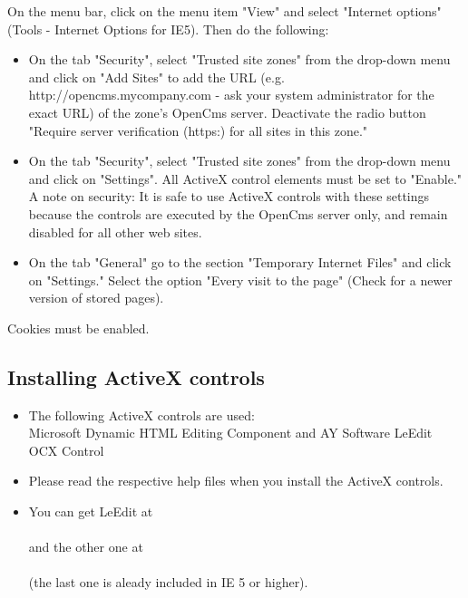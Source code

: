 On the menu bar, click on the menu item "View" and select "Internet options" 
(Tools - Internet Options for IE5). Then do the following: 
\begin{itemize}
\item On the tab "Security", select "Trusted site zones" from the drop-down menu and click on 
  "Add Sites" to add the URL (e.g. http://opencms.mycompany.com - ask your system administrator 
  for the exact URL) of the zone's OpenCms server. Deactivate the radio button "Require server 
  verification (https:) for all sites in this zone."

\item On the tab "Security", select "Trusted site zones" from the drop-down menu and click on 
  "Settings". All ActiveX control elements must be set to "Enable." A note on security: 
  It is safe to use ActiveX  controls with these settings because the controls are executed 
  by the OpenCms server only, and remain disabled for all other web sites.

\item On the tab "General" go to the section "Temporary Internet Files" and click on "Settings." 
  Select the option "Every visit to the page" (Check for a newer version of stored pages).
\end{itemize}

Cookies must be enabled.
 

\subsection{Installing ActiveX controls}

\begin{itemize}
\item The following ActiveX controls are used: \\
  Microsoft Dynamic HTML Editing Component and AY Software LeEdit OCX Control \\
\item Please read the respective help files when you install the ActiveX controls.\\
\item You can get LeEdit at \\
  \\ 
  and the other one at \\ 
  \\
  (the last one is aleady included in IE 5 or higher).
\end{itemize}


